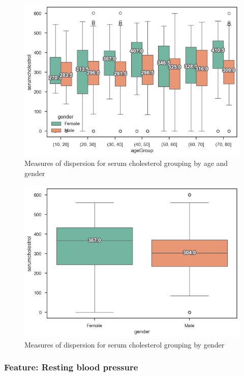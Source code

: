 \begin{figure}
    \caption{Measures of dispersion for serum cholesterol grouping by age and gender}\label{boxplot-cholesterol-age}
    \centering
    \includegraphics[width=\linewidth]{media/boxplot-05-agegroup-gender-cholesterol.png}
\end{figure}

\begin{figure}
    \caption{Measures of dispersion for serum cholesterol grouping by gender}\label{boxplot-cholesterol-gender}
    \centering
    \includegraphics[width=\linewidth]{media/boxplot-06-gender-cholesterol.png}
\end{figure}

\subsubsection{Feature: Resting blood pressure}

